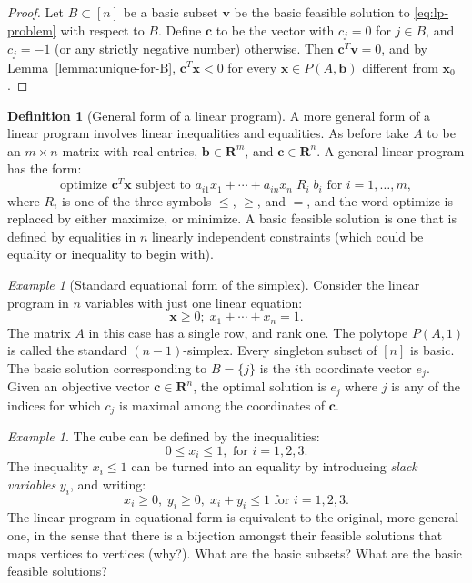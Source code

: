 \documentclass{amsbook}
\newcommand{\vv}{\mathbf v}
\newcommand{\xx}{\mathbf x}
\newcommand{\cc}{\mathbf c}
\newcommand{\bb}{\mathbf b}
\newcommand{\RR}{\mathbf R}
\theoremstyle{definition}
\newtheorem{definition}[theorem]{Definition}
\theoremstyle{remark}
\newtheorem{example}[theorem]{Example}
\begin{document}
\begin{proof}
  Let $B\subset [n]$ be a basic subset $\vv$ be the basic feasible solution to \eqref{eq:lp-problem} with respect to $B$.
  Define $\cc$ to be the vector with $c_j=0$ for $j\in B$, and $c_j=-1$ (or any strictly negative number) otherwise.
  Then $\cc^T\vv=0$, and by Lemma~\ref{lemma:unique-for-B}, $\cc^T\xx<0$ for every $\xx\in P(A,\bb)$ different from $\xx_0$.
\end{proof}
\begin{definition}
  [General form of a linear program]
  A more general form of a linear program involves linear inequalities and equalities.
  As before take $A$ to be an $m\times n$ matrix with real entries, $\bb\in \RR^m$, and $\cc\in \RR^n$.
  A general linear program has the form:
  \begin{equation}
    \label{eq:general-lp}
    \tag{GLP}
    \text{optimize $\cc^T\xx$ subject to }a_{i1}x_1+\dotsb + a_{in}x_n\; R_i\; b_i \text{ for }i=1,\dotsc,m,
  \end{equation}
  where $R_i$ is one of the three symbols $\leq$, $\geq$, and $=$, and the word optimize is replaced by either maximize, or minimize.
  A basic feasible solution is one that is defined by equalities in $n$ linearly independent constraints (which could be equality or inequality to begin with).
\end{definition}
\begin{example}
  [Standard equational form of the simplex]
  Consider the linear program in $n$ variables with just one linear equation:
  \begin{displaymath}
    \xx\geq 0;\; x_1+\dotsb+x_n=1.
  \end{displaymath}
  The matrix $A$ in this case has a single row, and rank one.
  The polytope $P(A,1)$ is called the standard $(n-1)$-simplex.
  Every singleton subset of $[n]$ is basic.
  The basic solution corresponding to $B=\{j\}$ is the $i$th coordinate vector $e_j$.
  Given an objective vector $\cc\in \RR^n$, the optimal solution is $e_j$ where $j$ is any of the indices for which $c_j$ is maximal among the coordinates of $\cc$.
\end{example}
\begin{example}
  The cube can be defined by the inequalities:
  \begin{displaymath}
    0\leq x_i \leq 1, \text{ for } i=1,2,3.
  \end{displaymath}
  The inequality $x_i\leq 1$ can be turned into an equality by introducing \emph{slack variables} $y_i$, and writing:
  \begin{displaymath}
    x_i\geq 0,\;y_i\geq 0,\;x_i+y_i\leq 1 \text{ for }i=1,2,3.
  \end{displaymath}
  The linear program in equational form is equivalent to the original, more general one, in the sense that there is a bijection amongst their feasible solutions that maps vertices to vertices (why?).
  What are the basic subsets? What are the basic feasible solutions?
\end{example}
\end{document}

